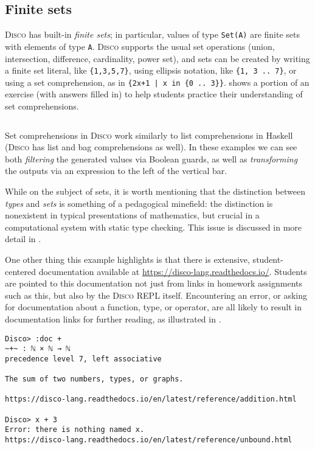 \documentclass[submission,copyright,creativecommons]{eptcs}
\newcommand{\disco}{\textsc{Disco}\xspace}
\newcommand{\pref}[1]{\prettyref{#1}}
\begin{document}
\subsection{Finite sets}

\disco has built-in \emph{finite sets}; in particular, values of type
\texttt{Set(A)} are finite sets with elements of type
\texttt{A}. \disco supports the usual set operations (union,
intersection, difference, cardinality, power set), and sets can be created by
writing a finite set literal, like \verb|{1,3,5,7}|, using ellipsis
notation, like \verb|{1, 3 .. 7}|, or using a set comprehension, as in
\verb-{2x+1 | x in {0 .. 3}}-. \pref{lst:sets} shows a portion
of an exercise (with answers filled in) to help students practice
their understanding of set comprehensions.

\begin{listing}[!htp]
\inputminted{text}{examples/sets.disco}
\caption{Set comprehension exercise}
\label{lst:sets}
\end{listing}

Set comprehensions in \disco work similarly to list comprehensions in
Haskell (\disco has list and bag comprehensions as well).  In
these examples we can see both \emph{filtering} the generated values via
Boolean guards, as well as \emph{transforming} the outputs via an
expression to the left of the vertical bar.

While on the subject of sets, it is worth mentioning that the
distinction between \emph{types} and \emph{sets} is something of a
pedagogical minefield: the distinction is nonexistent in typical
presentations of mathematics, but crucial in a computational system
with static type checking.  This issue is discussed in more detail in
\pref{sec:typesvsets}.

One other thing this example highlights is that there is extensive,
student-centered documentation available at
\url{https://disco-lang.readthedocs.io/}.  Students are pointed to
this documentation not just from links in homework assignments such as
this, but also by the \disco REPL itself. Encountering an error, or
asking for documentation about a function, type, or operator, are
all likely to result in documentation links for further reading, as
illustrated in \pref{lst:doc}.

\begin{listing}[!htp]
\begin{verbatim}
Disco> :doc +
~+~ : ℕ × ℕ → ℕ
precedence level 7, left associative

The sum of two numbers, types, or graphs.

https://disco-lang.readthedocs.io/en/latest/reference/addition.html

Disco> x + 3
Error: there is nothing named x.
https://disco-lang.readthedocs.io/en/latest/reference/unbound.html
\end{verbatim}
\caption{\disco generates links to online documentation}
\label{lst:doc}
\end{listing}
\end{document}
